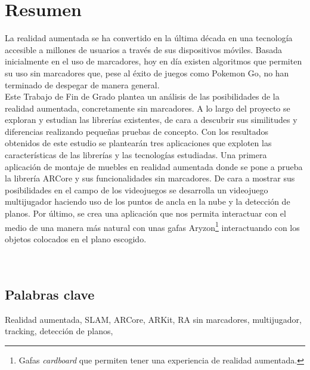 \newpage
\chapter*{Resumen}
La realidad aumentada se ha convertido en la última década en una tecnología accesible a millones de usuarios a través de sus dispositivos móviles. Basada inicialmente en el uso de marcadores, hoy en día existen algoritmos que permiten su uso sin marcadores que, pese al éxito de juegos como Pokemon Go, no han terminado de despegar de manera general.\\

Este Trabajo de Fin de Grado plantea un análisis de las posibilidades de la realidad aumentada, concretamente sin marcadores. A lo largo del proyecto se exploran y estudian las librerías existentes, de cara a descubrir sus similitudes y diferencias realizando pequeñas pruebas de concepto. Con los resultados obtenidos de este estudio se plantearán tres aplicaciones que exploten las características de las librerías y las tecnologías estudiadas. Una primera aplicación de montaje de muebles en realidad aumentada donde se pone a prueba la librería ARCore y sus funcionalidades sin marcadores. De cara a mostrar sus posibilidades en el campo de los videojuegos se desarrolla un videojuego multijugador haciendo uso de los puntos de ancla en la nube y la detección de planos. Por último, se crea una aplicación que nos permita interactuar con el medio de una manera más natural con unas gafas Aryzon\footnote{Gafas \textit{cardboard} que permiten tener una experiencia de realidad aumentada.\cite{Aryzon}} interactuando con los objetos colocados en el plano escogido.\\
\\
\\

\section*{Palabras clave}
Realidad aumentada, SLAM, ARCore, ARKit, RA sin marcadores, multijugador, tracking, detección de planos, 

\noindent